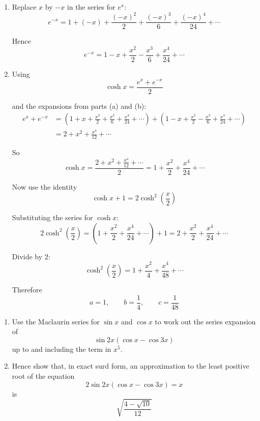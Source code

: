 \documentclass[leqno]{article}
\begin{document}
\begin{enumerate}[
  label=\textbf{\arabic*.},
  leftmargin=*,
  topsep=0pt,
  partopsep=0pt,
  parsep=0pt
]
\begin{djsSolution}
\begin{enumerate}[label=\textbf{(\alph*)}]
  \item Replace $x$ by $-x$ in the series for $e^x$:
\[
e^{-x}=1+(-x)+\frac{(-x)^2}{2}+\frac{(-x)^3}{6}+\frac{(-x)^4}{24}+\cdots
\]

Hence
\[
e^{-x}=1-x+\frac{x^2}{2}-\frac{x^3}{6}+\frac{x^4}{24}+\cdots
\]

  \item Using
\[
\cosh x=\frac{e^x+e^{-x}}{2}
\]

and the expansions from parts (a) and (b):
\begin{align*}
e^x+e^{-x}
&=\left(1+x+\frac{x^2}{2}+\frac{x^3}{6}+\frac{x^4}{24}+\cdots\right)
+\left(1-x+\frac{x^2}{2}-\frac{x^3}{6}+\frac{x^4}{24}+\cdots\right) \\
&=2+x^2+\frac{x^4}{12}+\cdots
\end{align*}

So
\[
\cosh x=\frac{2+x^2+\frac{x^4}{12}+\cdots}{2}
=1+\frac{x^2}{2}+\frac{x^4}{24}+\cdots
\]

Now use the identity
\[
\cosh x+1=2\cosh^2\left(\frac{x}{2}\right)
\]

Substituting the series for $\cosh x$:
\[
2\cosh^2\left(\frac{x}{2}\right)
= \left(1+\frac{x^2}{2}+\frac{x^4}{24}+\cdots\right)+1
=2+\frac{x^2}{2}+\frac{x^4}{24}+\cdots
\]

Divide by $2$:
\[
\cosh^2\left(\frac{x}{2}\right)=1+\frac{x^2}{4}+\frac{x^4}{48}+\cdots
\]

Therefore
\[
a=1,\qquad b=\frac14,\qquad c=\frac1{48}
\]
\end{enumerate}
\end{djsSolution}


\newpage

\questionitem

\begin{enumerate}[label=\textbf{(\roman*)}]
  \item Use the Maclaurin series for $\sin x$ and $\cos x$ to work out the series expansion of \[\sin 2x(\cos x-\cos 3x)\] up to and including the term in $x^5$.  \\
  \item Hence show that, in exact surd form, an approximation to the least positive root of the equation \[2\sin 2x(\cos x-\cos 3x)=x\] is \[\sqrt{\frac{4-\sqrt{10}}{12}}
\] \\
\end{enumerate}

\vspace*{10pt}


\end{enumerate}
\end{document}
